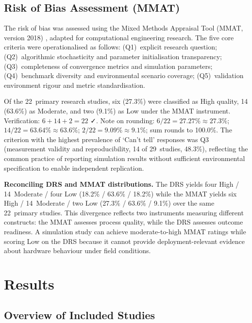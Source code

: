 \documentclass[review,3p]{elsarticle}
\begin{document}
\subsection{Risk of Bias Assessment (MMAT)}
\label{subsec:mmat}

The risk of bias was assessed using the Mixed Methods Appraisal Tool
(MMAT, version 2018) \cite{hong2018}, adapted for computational engineering
research. The five core criteria were operationalised as follows:
(Q1)~explicit research question; (Q2)~algorithmic stochasticity and parameter
initialisation transparency; (Q3)~completeness of convergence metrics and
simulation parameters; (Q4)~benchmark diversity and environmental scenario
coverage; (Q5)~validation environment rigour and metric standardisation.

Of the 22~primary research studies, six (27.3\%) were classified as High
quality, 14 (63.6\%) as Moderate, and two (9.1\%) as Low under the MMAT
instrument. Verification: $6+14+2=22$ ✓. Note on rounding: $6/22=27.27\%
\approx 27.3\%$; $14/22=63.64\% \approx 63.6\%$; $2/22=9.09\% \approx 9.1\%$;
sum rounds to 100.0\%. The criterion with the highest prevalence of `Can't
tell' responses was Q3 (measurement validity and reproducibility, 14 of
29~studies, 48.3\%), reflecting the common practice of reporting simulation
results without sufficient environmental specification to enable independent
replication.

\textbf{Reconciling DRS and MMAT distributions.} The DRS yields
four High / 14~Moderate / four Low (18.2\% / 63.6\% / 18.2\%) while the
MMAT yields six High / 14~Moderate / two Low (27.3\% / 63.6\% / 9.1\%)
over the same 22~primary studies. This divergence reflects two instruments
measuring different constructs: the MMAT assesses process quality, while the
DRS assesses outcome readiness. A simulation study can achieve moderate-to-high
MMAT ratings while scoring Low on the DRS because it cannot provide
deployment-relevant evidence about hardware behaviour under field conditions.


\section{Results}

\subsection{Overview of Included Studies}
\label{subsec:overview}
\end{document}
